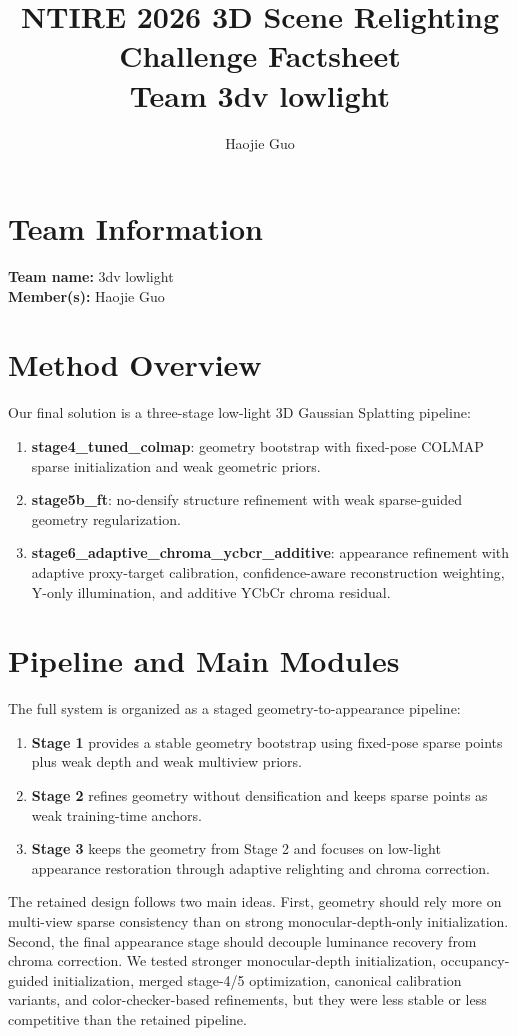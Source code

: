 \documentclass[10pt,a4paper]{article}
\title{\textbf{NTIRE 2026 3D Scene Relighting Challenge Factsheet}\\
\large Team 3dv lowlight}
\author{Haojie Guo}
\date{}
\begin{document}
\maketitle

\section{Team Information}
\textbf{Team name:} 3dv lowlight\\
\textbf{Member(s):} Haojie Guo

\section{Method Overview}
Our final solution is a three-stage low-light 3D Gaussian Splatting pipeline:
\begin{enumerate}[leftmargin=2em]
  \item \textbf{stage4\_tuned\_colmap}: geometry bootstrap with fixed-pose COLMAP sparse initialization and weak geometric priors.
  \item \textbf{stage5b\_ft}: no-densify structure refinement with weak sparse-guided geometry regularization.
  \item \textbf{stage6\_adaptive\_chroma\_ycbcr\_additive}: appearance refinement with adaptive proxy-target calibration, confidence-aware reconstruction weighting, Y-only illumination, and additive YCbCr chroma residual.
\end{enumerate}

\section{Pipeline and Main Modules}
The full system is organized as a staged geometry-to-appearance pipeline:
\begin{enumerate}[leftmargin=2em]
  \item \textbf{Stage 1} provides a stable geometry bootstrap using fixed-pose sparse points plus weak depth and weak multiview priors.
  \item \textbf{Stage 2} refines geometry without densification and keeps sparse points as weak training-time anchors.
  \item \textbf{Stage 3} keeps the geometry from Stage 2 and focuses on low-light appearance restoration through adaptive relighting and chroma correction.
\end{enumerate}

The retained design follows two main ideas. First, geometry should rely more on multi-view sparse consistency than on strong monocular-depth-only initialization. Second, the final appearance stage should decouple luminance recovery from chroma correction. We tested stronger monocular-depth initialization, occupancy-guided initialization, merged stage-4/5 optimization, canonical calibration variants, and color-checker-based refinements, but they were less stable or less competitive than the retained pipeline.
\end{document}
